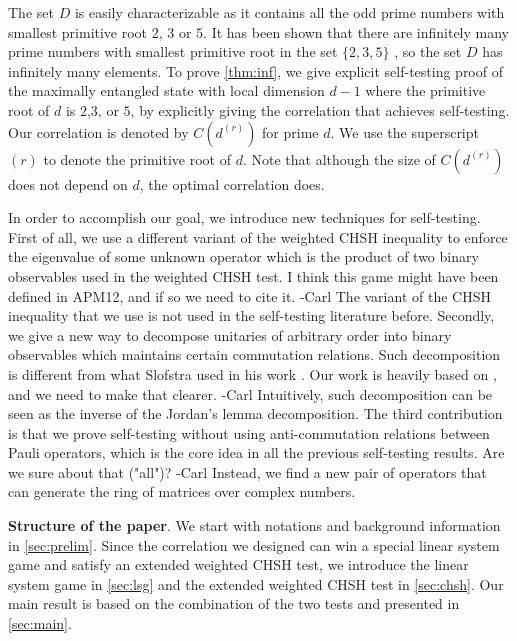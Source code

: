 \documentclass[11pt,letterpaper]{article}
\newcommand{\1}{\mathbb{1}}
\newcommand{\dr}[1]{d^{(#1)}}
\def\carl#1{{\color{blue} #1 -Carl}}
\newtheorem{theorem}{Theorem}
\theoremstyle{definition}
\begin{document}
The set $D$ is easily characterizable as it contains all the odd prime numbers with smallest
primitive root $2$, $3$ or $5$. It has been shown that there are infinitely many prime numbers
with smallest primitive root in the set $\{2,3,5\}$ \cite{murty1988}, so the set $D$ has infinitely many elements.
To prove \cref{thm:inf}, we give explicit self-testing proof of 
the maximally entangled state with local dimension $d-1$ where the primitive root of $d$ is $2$,$3$, or $5$, 
by explicitly giving the correlation that achieves self-testing. 
Our correlation is denoted by $C(\dr{r})$ for prime $d$.
We use the superscript $(r)$ to denote the primitive root of $d$.
Note that although the size of $C(\dr{r})$ does not depend on $d$, the optimal correlation does.


In order to accomplish our goal, we introduce new techniques for self-testing.
First of all, we use a different variant of the weighted CHSH inequality to enforce the eigenvalue of
some unknown operator which is the product of two binary observables used in the weighted CHSH test.
\carl{I think this game might have been defined in APM12, and if so we need to cite it.}
The variant of the CHSH inequality that we use is not used in the self-testing literature before.
Secondly, we give a new way to decompose unitaries of arbitrary order into binary observables which maintains
certain commutation relations. Such decomposition is different from what Slofstra used in his work \cite{slofstra2017}.
\carl{Our work is heavily based on \cite{slofstra2017}, and we need to make that clearer.}
Intuitively, such decomposition can be seen as the inverse of the Jordan's lemma decomposition.
The third contribution is that we prove self-testing without using anti-commutation relations between Pauli operators, 
which is the core idea in all the previous self-testing results.
\carl{Are we sure about that ("all")?}
Instead, we find a new pair of operators that can generate the ring of matrices over complex numbers.


\textbf{Structure of the paper}.
We start with notations and background information in \cref{sec:prelim}.
Since the correlation we designed can win a special linear system game and satisfy
an extended weighted CHSH test, we introduce the linear system game
in \cref{sec:lsg} and the extended weighted CHSH test in \cref{sec:chsh}. 
Our main result is based on the combination of the two tests and presented in \cref{sec:main}. 
\end{document}
